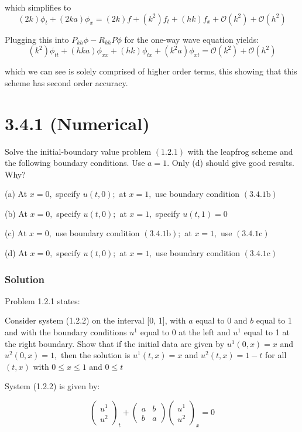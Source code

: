 \documentclass[12pt]{article}
\begin{document}
\noindent which simplifies to
$$ (2k)\phi_t + (2ka)\phi_x = (2k)f + (k^2)f_t + (hk)f_x +\mathcal{O}(k^2)+ \mathcal{O}(h^2)$$

\noindent Plugging this into $P_{kh}\phi - R_{kh}P\phi$ for the one-way wave equation yields:
$$ (k^2)\phi_{tt} + (hka)\phi_{xx} + (hk)\phi_{tx}+ (k^2a)\phi_{xt}= \mathcal{O}(k^2)+ \mathcal{O}(h^2)$$

\noindent which we can see is solely comprised of higher order terms, this showing that this scheme has second order accuracy.


\pagebreak
\section*{3.4.1 (Numerical)}
Solve the initial-boundary value problem $(1.2 .1)$ with the leapfrog scheme and the following boundary conditions. Use $a=1 .$ Only (d) should give good results. Why?

(a) At $x=0,$ specify $u(t, 0) ;$ at $x=1,$ use boundary condition $(3.4 .1 \mathrm{b})$

(b) At $x=0,$ specify $u(t, 0) ;$ at $x=1,$ specify $u(t, 1)=0$

(c) At $x=0,$ use boundary condition $(3.4 .1 \mathrm{b}) ;$ at $x=1,$ use $(3.4 .1 \mathrm{c})$

(d) At $x=0,$ specify $u(t, 0) ;$ at $x=1,$ use boundary condition $(3.4 .1 \mathrm{c})$

\subsubsection*{Solution}

Problem 1.2.1 states:

Consider system (1.2.2) on the interval [0, 1], with $a$ equal to 0 and $b$ equal to 1 and with the boundary conditions $u^{1}$ equal to 0 at the left and $u^{1}$ equal to 1 at the right boundary. Show that if the initial data are given by $u^{1}(0, x)=x$ and $u^{2}(0, x)=1,$ then the solution is $u^{1}(t, x)=x$ and $u^{2}(t, x)=1-t$ for all $(t, x)$ with $0 \leq x \leq 1$ and $0 \leq t$

System (1.2.2) is given by:

$$
\left(\begin{array}{l}
u^{1} \\
u^{2}
\end{array}\right)_{t}+\left(\begin{array}{ll}
a & b \\
b & a
\end{array}\right)\left(\begin{array}{l}
u^{1} \\
u^{2}
\end{array}\right)_{x}=0
$$
\end{document}
